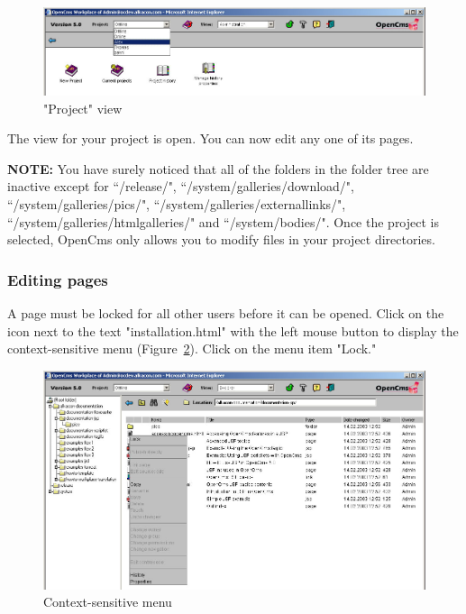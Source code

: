 \begin{figure}[!hbt]
\begin{center}
\includegraphics[width=\sgw]
                   {pics/usermanual/projectView}
\caption["Project" view]
           {"Project" view}
\label{projectview}
\end{center}
\end{figure}

The view for your project is open. You can now edit any one of its pages.

\textbf{NOTE:} You have surely noticed that all of the folders in
the folder tree are inactive except for ``/release/", ``/system/galleries/download/",
``/system/galleries/pics/", ``/system/galleries/externallinks/", 
``/system/galleries/htmlgalleries/" and ``/system/bodies/". 
Once the project is selected, OpenCms only allows you to modify files in your project directories.

\subsubsection{Editing pages}

A page must be locked for all other users before it can be opened.
Click on the icon next to the text "installation.html" with the left
mouse button to display the context-sensitive menu
(Figure~\ref{lockpage}). Click on the menu item "Lock."

\begin{figure}[!hbt]
\begin{center}
\includegraphics[width=\sgw]
                   {pics/usermanual/pageMenuUnlocked}
\caption[Context-sensitive menu]
           {Context-sensitive menu}
\label{lockpage}
\end{center}
\end{figure}

